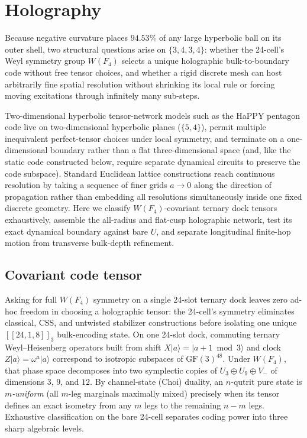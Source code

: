 \section{Holography}
\label{sec:holography}

Because negative curvature places $94.53\%$ of any large hyperbolic ball on its outer shell, two structural questions
arise on $\{3,4,3,4\}$: whether the 24-cell's Weyl symmetry group $W(F_4)$ selects a unique holographic
bulk-to-boundary code without free tensor choices, and whether a rigid discrete mesh can host arbitrarily fine spatial
resolution without shrinking its local rule or forcing moving excitations through infinitely many sub-steps.

Two-dimensional hyperbolic tensor-network models such as the HaPPY pentagon code \cite{pastawski2015happy} live on
two-dimensional hyperbolic planes ($\{5,4\}$), permit multiple inequivalent perfect-tensor choices under local symmetry,
and terminate on a one-dimensional boundary rather than a flat three-dimensional space (and, like the static code
constructed below, require separate dynamical circuits to preserve the code subspace). Standard Euclidean lattice
constructions reach continuous resolution by taking a sequence of finer grids $a \to 0$ along the direction of
propagation rather than embedding all resolutions simultaneously inside one fixed discrete geometry. Here we classify
$W(F_4)$-covariant ternary dock tensors exhaustively, assemble the all-radius and flat-cusp holographic network, test its
exact dynamical boundary against bare $U$, and separate longitudinal finite-hop motion from transverse bulk-depth
refinement.

\subsection{Covariant code tensor}

Asking for full $W(F_4)$ symmetry on a single 24-slot ternary dock leaves zero ad-hoc freedom in choosing a holographic
tensor: the 24-cell's symmetry eliminates classical, CSS, and untwisted stabilizer constructions before isolating one
unique $[[24, 1, 8]]_3$ bulk-encoding state. On one 24-slot dock, commuting ternary Weyl--Heisenberg operators built
from shift $X|a\rangle = |a+1 \bmod 3\rangle$ and clock $Z|a\rangle = \omega^a|a\rangle$ correspond to isotropic
subspaces of $\mathrm{GF}(3)^{48}$. Under $W(F_4)$, that phase space decomposes into two symplectic copies of
$U_3 \oplus U_9 \oplus V_-$ of dimensions $3$, $9$, and $12$. By channel-state (Choi) duality, an $n$-qutrit pure state
is \emph{$m$-uniform} (all $m$-leg marginals maximally mixed) precisely when its tensor defines an exact isometry from
any $m$ legs to the remaining $n - m$ legs. Exhaustive classification on the bare 24-cell separates coding power into
three sharp algebraic levels.

